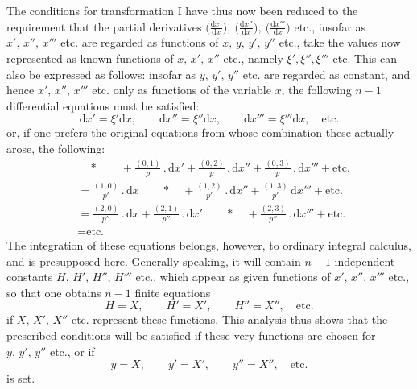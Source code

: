 The conditions for transformation I have thus now been reduced to the requirement that the partial derivatives \(\bigl(\frac{\mathrm{d}x'}{\mathrm{d}x}\bigr),\ \bigl(\frac{\mathrm{d}x''}{\mathrm{d}x}\bigr),\ \bigl(\frac{\mathrm{d}x'''}{\mathrm{d}x}\bigr)\) etc., insofar as \(x',\,x'',\,x'''\) etc. are regarded as functions of \(x,\,y,\,y',\,y''\) etc., take the values now represented as known functions of \(x,\,x',\,x''\) etc., namely \(\xi',\xi'',\xi'''\) etc. This can also be expressed as follows: insofar as \(y,\,y',\,y''\) etc. are regarded as constant, and hence \(x',\,x'',\,x'''\) etc. only as functions of the variable \(x\), the following \(n-1\) differential equations must be satisfied:
\[
\mathrm{d}x'=\xi'\mathrm{d}x,\qquad
\mathrm{d}x''=\xi''\mathrm{d}x,\qquad
\mathrm{d}x'''=\xi'''\mathrm{d}x,\quad\text{etc.}
\]
or, if one prefers the original equations from whose combination these actually arose, the following:
\[
\begin{aligned}
&\quad *\qquad +\frac{(0,1)}{p}\mathbin{.}\mathrm{d}x'
 +\frac{(0,2)}{p}\mathbin{.}\mathrm{d}x''
 +\frac{(0,3)}{p}\mathbin{.}\mathrm{d}x'''+\text{etc.}\\
&=\frac{(1,0)}{p'}\mathbin{.}\mathrm{d}x\qquad *\quad
 +\frac{(1,2)}{p'}\mathbin{.}\mathrm{d}x''
 +\frac{(1,3)}{p'}\,\mathrm{d}x'''+\text{etc.}\\
&=\frac{(2,0)}{p''}\mathbin{.}\mathrm{d}x
 +\frac{(2,1)}{p''}\mathbin{.}\mathrm{d}x'\qquad *\quad
 +\frac{(2,3)}{p''}\mathbin{.}\mathrm{d}x'''+\text{etc.}\\
&=\text{etc.}
\end{aligned}
\]
The integration of these equations belongs, however, to ordinary integral calculus, and is presupposed here. Generally speaking, it will contain \(n-1\) independent constants \(H,\,H',\,H'',\,H'''\) etc., which appear as given functions of \(x',\,x'',\,x'''\) etc., so that one obtains \(n-1\) finite equations
\[
H=X,\qquad H'=X',\qquad H''=X'',\quad\text{etc.}
\]
if \(X,\,X',\,X''\) etc. represent these functions. This analysis thus shows that the prescribed conditions will be satisfied if these very functions are chosen for \(y,\,y',\,y''\) etc., or if
\[
y=X,\qquad y'=X',\qquad y''=X'',\quad\text{etc.}
\]
is set.

